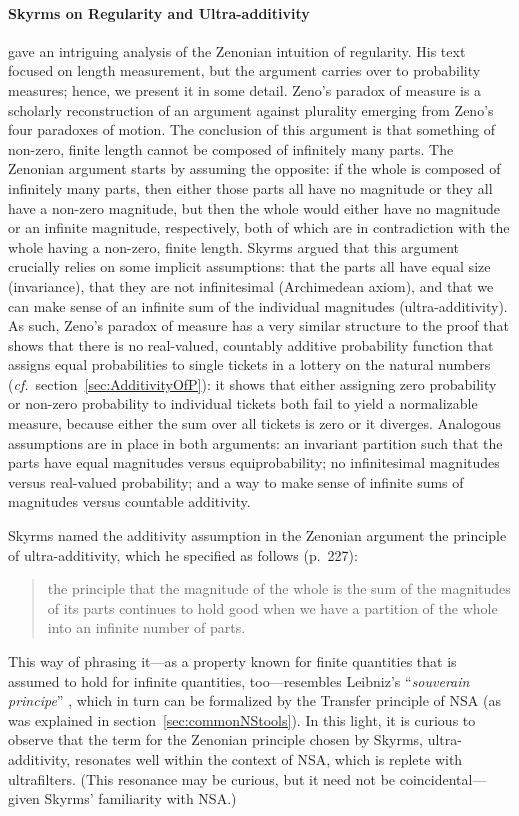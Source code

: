\paragraph{Skyrms on Regularity and Ultra-additivity}\label{sec:Zenonian}
\citet{Skyrms:1983a} gave an intriguing analysis of the Zenonian intuition of regularity. His text focused on length measurement, but the argument carries over to probability measures; hence, we present it in some detail. Zeno's paradox of measure is a scholarly reconstruction of an argument against plurality emerging from Zeno's four paradoxes of motion. The conclusion of this argument is that something of non-zero, finite length cannot be composed of infinitely many parts. The Zenonian argument starts by assuming the opposite: if the whole is composed of infinitely many parts, then either those parts all have no magnitude or they all have a non-zero magnitude, but then the whole would either have no magnitude or an infinite magnitude, respectively, both of which are in contradiction with the whole having a non-zero, finite length.
Skyrms argued that this argument crucially relies on some implicit assumptions: that the parts all have equal size (invariance), that they are not infinitesimal (Archimedean axiom), and that we can make sense of an infinite sum of the individual magnitudes (ultra-additivity).
As such, Zeno's paradox of measure has a very similar structure to the proof that shows that there is no real-valued, countably additive probability function that assigns equal probabilities to single tickets in a lottery on the natural numbers (\textit{cf.}\ section~\ref{sec:AdditivityOfP}): it shows that either assigning zero probability or non-zero probability to individual tickets both fail to yield a normalizable measure, because either the sum over all tickets is zero or it diverges. Analogous assumptions are in place in both arguments: an invariant partition such that the parts have equal magnitudes versus equiprobability; no infinitesimal magnitudes versus real-valued probability; and a way to make sense of infinite sums of magnitudes versus countable additivity.

Skyrms named the additivity assumption in the Zenonian argument the principle of ultra-additivity, which he specified as follows (p.~227):
\begin{quote}
the principle that the magnitude of the whole is the sum of the magnitudes of its parts continues to hold good when we have a partition of the whole into an infinite number of parts.
\end{quote}
This way of phrasing it---as a property known for finite quantities that is assumed to hold for infinite quantities, too---resembles Leibniz's ``\textit{souverain principe}'' \citep[see][section~4.3]{KatzSherry:2012a}, which in turn can be formalized by the Transfer principle of NSA (as was explained in section~\ref{sec:commonNStools}). In this light, it is curious to observe that the term for the Zenonian principle chosen by Skyrms, ultra-additivity, resonates well within the context of NSA, which is replete with ultrafilters. (This resonance may be curious, but it need not be coincidental---given Skyrms' familiarity with NSA.)

